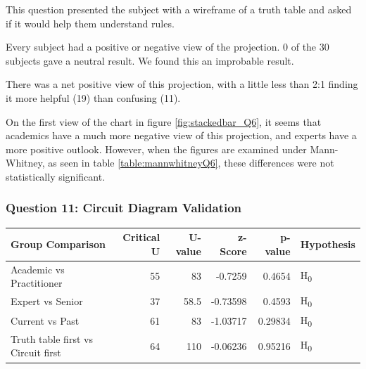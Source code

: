 This question presented the subject with a wireframe of a truth table and asked if it would help them understand rules.

Every subject had a positive or negative view of the projection.
0 of the 30 subjects gave a neutral result.
We found this an improbable result.

There was a net positive view of this projection, with a little less than 2:1 finding it more helpful (19) than confusing (11).

On the first view of the chart in figure \ref{fig:stackedbar_Q6}, it seems that academics have a much more negative view of this projection, and experts have a more positive outlook.
However, when the figures are examined under Mann-Whitney, as seen in table \ref{table:mannwhitneyQ6}, these differences were not statistically significant.

\subsubsection{Question 11: Circuit Diagram Validation}
\noindent\begin{minipage}{\linewidth}
    \centering
    \label{fig:stackedbar_Q7}
    
    \begin{tabular}{ |l ||r |r |r | r|l | } 
        \hline
        Group Comparison                   & Critical U & U-value & z-Score  & p-value & Hypothesis         \\
        \hline
        \hline
        Academic vs Practitioner           & 55         & 83      & -0.7259  & 0.4654  & H\textsubscript{0} \\ 
        \hline
        Expert vs Senior                   & 37         & 58.5    & -0.73598 & 0.4593  & H\textsubscript{0} \\ 
        \hline
        Current vs Past                    & 61         & 83      & -1.03717 & 0.29834 & H\textsubscript{0} \\ 
        \hline
        Truth table first vs Circuit first & 64         & 110     & -0.06236 & 0.95216 & H\textsubscript{0} \\ 
        \hline
    \end{tabular}
    \label{table:mannwhitneyQ7}
\end{minipage} 


